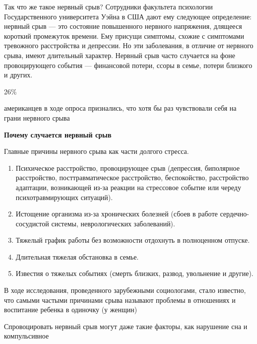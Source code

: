 Так что же такое нервный срыв? Сотрудники факультета психологии Государственного университета Уэйна в США дают ему следующее определение: нервный срыв — это состояние повышенного нервного напряжения, длящееся короткий промежуток времени. Ему присущи симптомы, схожие с симптомами тревожного расстройства и депрессии. Но эти заболевания, в отличие от нервного срыва, имеют длительный характер. Нервный срыв часто случается на фоне провоцирующего события — финансовой потери, ссоры в семье, потери близкого и других.

\begin{framed}
    \begin{center}
        {
            \Huge
            26\%
        }

        {
            \Large
            американцев в ходе опроса признались, что хотя бы раз чувствовали себя на грани нервного срыва
        }
    \end{center}
\end{framed}

\textbf{Почему случается нервный срыв}

Главные причины нервного срыва как части долгого стресса.
\begin{enumerate}
    \item Психическое расстройство, провоцирующее срыв (депрессия, биполярное расстройство, посттравматическое расстройство, беспокойство, расстройство адаптации, возникающей из-за реакции на стрессовое событие или череду психотравмирующих ситуаций).
    \item Истощение организма из-за хронических болезней (сбоев в работе сердечно-сосудистой системы, неврологических заболеваний).
    \item Тяжелый график работы без возможности отдохнуть в полноценном отпуске.
    \item Длительная тяжелая обстановка в семье.
    \item Известия о тяжелых событиях (смерть близких, развод, увольнение и другие).
\end{enumerate}

\begin{center}
    \Large
    В ходе исследования, проведенного зарубежными социологами, стало известно, что самыми частыми причинами срыва называют проблемы в отношениях и воспитание ребенка в одиночку (у женщин)
\end{center}

Спровоцировать нервный срыв могут даже такие факторы, как нарушение сна и компульсивное

